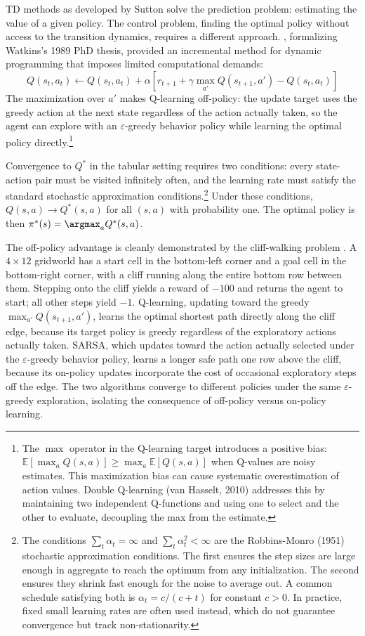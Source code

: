 TD methods as developed by Sutton solve the prediction problem: estimating the value of a given policy. The control problem, finding the optimal policy without access to the transition dynamics, requires a different approach. \citet{WatkinsDayan1992}, formalizing Watkins's 1989 PhD thesis, provided an incremental method for dynamic programming that imposes limited computational demands:
\begin{equation}
Q(s_t, a_t) \leftarrow Q(s_t, a_t) + \alpha \left[ r_{t+1} + \gamma \max_{a'} Q(s_{t+1}, a') - Q(s_t, a_t) \right]
\end{equation}
The maximization over $a'$ makes Q-learning off-policy: the update target uses the greedy action at the next state regardless of the action actually taken, so the agent can explore with an $\varepsilon$-greedy behavior policy while learning the optimal policy directly.\footnote{The $\max$ operator in the Q-learning target introduces a positive bias: $\mathbb{E}[\max_a Q(s,a)] \geq \max_a \mathbb{E}[Q(s,a)]$ when Q-values are noisy estimates. This maximization bias can cause systematic overestimation of action values. Double Q-learning (van Hasselt, 2010) addresses this by maintaining two independent Q-functions and using one to select and the other to evaluate, decoupling the max from the estimate.}

Convergence to $Q^*$ in the tabular setting requires two conditions: every state-action pair must be visited infinitely often, and the learning rate must satisfy the standard stochastic approximation conditions.\footnote{The conditions $\sum_t \alpha_t = \infty$ and $\sum_t \alpha_t^2 < \infty$ are the Robbins-Monro (1951) stochastic approximation conditions. The first ensures the step sizes are large enough in aggregate to reach the optimum from any initialization. The second ensures they shrink fast enough for the noise to average out. A common schedule satisfying both is $\alpha_t = c / (c + t)$ for constant $c > 0$. In practice, fixed small learning rates are often used instead, which do not guarantee convergence but track non-stationarity.} Under these conditions, $Q(s,a) \to Q^*(s,a)$ for all $(s,a)$ with probability one. The optimal policy is then $\pi^*(s) = \argmax_a Q^*(s,a)$.

The off-policy advantage is cleanly demonstrated by the cliff-walking problem \citep{sutton2018}. A $4 \times 12$ gridworld has a start cell in the bottom-left corner and a goal cell in the bottom-right corner, with a cliff running along the entire bottom row between them. Stepping onto the cliff yields a reward of $-100$ and returns the agent to start; all other steps yield $-1$. Q-learning, updating toward the greedy $\max_{a'} Q(s_{t+1}, a')$, learns the optimal shortest path directly along the cliff edge, because its target policy is greedy regardless of the exploratory actions actually taken. SARSA, which updates toward the action actually selected under the $\varepsilon$-greedy behavior policy, learns a longer safe path one row above the cliff, because its on-policy updates incorporate the cost of occasional exploratory steps off the edge. The two algorithms converge to different policies under the same $\varepsilon$-greedy exploration, isolating the consequence of off-policy versus on-policy learning.

